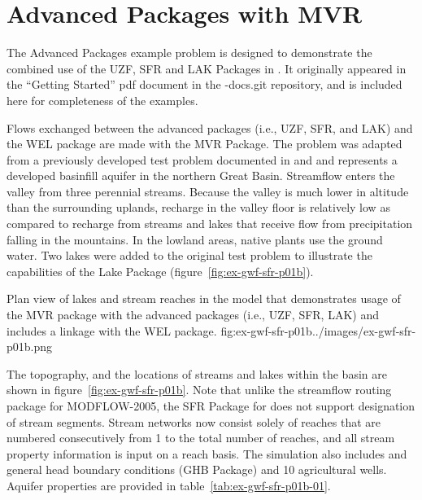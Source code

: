 \section{Advanced Packages with MVR}

The Advanced \mf Packages example problem is designed to demonstrate the combined use of the UZF, SFR and LAK Packages in \mf.  It originally appeared in the ``Getting Started'' pdf document in the \mf -docs.git repository, and is included here for completeness of the examples. 

Flows exchanged between the advanced packages (i.e., UZF, SFR, and LAK) and the WEL package are made with the MVR Package. The problem was adapted from a previously developed test problem documented in \cite{modflowsfr1pack} and \cite{modflowsfr2pack} and represents a developed basinfill aquifer in the northern Great Basin. Streamflow enters the valley from three perennial streams. Because the valley is much lower in altitude than the surrounding uplands, recharge in the valley floor is relatively low as compared to recharge from streams and lakes that receive flow from precipitation falling in the mountains. In the lowland areas, native plants use the ground water. Two lakes were added to the original test problem to illustrate the capabilities of the Lake Package (figure~\ref{fig:ex-gwf-sfr-p01b}).

\begin{StandardFigure}
	{Plan view of lakes and stream reaches in the \mf model that demonstrates usage of the MVR package with the advanced packages (i.e., UZF, SFR, LAK) and includes a linkage with the WEL package.}
	{fig:ex-gwf-sfr-p01b}{../images/ex-gwf-sfr-p01b.png}
\end{StandardFigure}

The topography, and the locations of streams and lakes within the basin are shown in figure~\ref{fig:ex-gwf-sfr-p01b}. Note that unlike the streamflow routing package for MODFLOW-2005, the SFR Package for \mf does not support designation of stream segments. Stream networks now consist solely of reaches that are numbered consecutively from 1 to the total number of reaches, and all stream property information is input on a reach basis. The simulation also includes and general head boundary conditions (GHB Package) and 10 agricultural wells. Aquifer properties are provided in table~\ref{tab:ex-gwf-sfr-p01b-01}.




